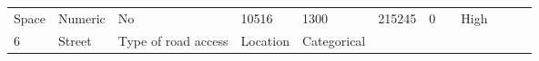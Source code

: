\documentclass[11pt]{article}
\begin{document}
\begin{longtable}[]{@{}llllllllllll@{}}
\begin{minipage}[t]{0.04\columnwidth}
Space\strut
\end{minipage} & \begin{minipage}[t]{0.04\columnwidth}\raggedright\strut
Numeric\strut
\end{minipage} & \begin{minipage}[t]{0.04\columnwidth}\raggedright\strut
No\strut
\end{minipage} & \begin{minipage}[t]{0.04\columnwidth}\raggedright\strut
10516\strut
\end{minipage} & \begin{minipage}[t]{0.04\columnwidth}\raggedright\strut
1300\strut
\end{minipage} & \begin{minipage}[t]{0.04\columnwidth}\raggedright\strut
215245\strut
\end{minipage} & \begin{minipage}[t]{0.04\columnwidth}\raggedright\strut
0\strut
\end{minipage} & \begin{minipage}[t]{0.04\columnwidth}\raggedright\strut
\strut
\end{minipage} & \begin{minipage}[t]{0.04\columnwidth}\raggedright\strut
High\strut
\end{minipage}\tabularnewline
\begin{minipage}[t]{0.04\columnwidth}\raggedright\strut
6\strut
\end{minipage} & \begin{minipage}[t]{0.04\columnwidth}\raggedright\strut
Street\strut
\end{minipage} & \begin{minipage}[t]{0.04\columnwidth}\raggedright\strut
Type of road access\strut
\end{minipage} & \begin{minipage}[t]{0.04\columnwidth}\raggedright\strut
Location\strut
\end{minipage} & \begin{minipage}[t]{0.04\columnwidth}\raggedright\strut
Categorical\strut
\end{minipage} & \begin{minipage}[t]{0.04\columnwidth}\raggedright\strut
\strut
\end{minipage} & \begin{minipage}[t]{0.04\columnwidth}\raggedright\strut
\strut
\end{minipage} & \begin{minipage}[t]{0.04\columnwidth}\raggedright\strut

\end{minipage}
\end{longtable}
\end{document}
